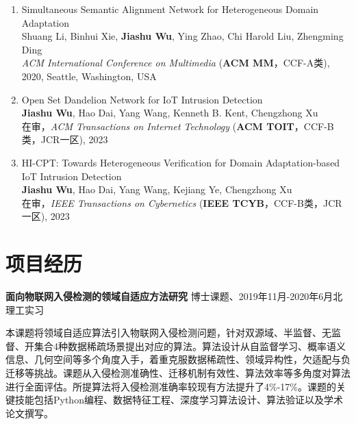 \documentclass[letterpaper,11pt]{article}
\begin{document}
\begin{enumerate}
  \item Simultaneous Semantic Alignment Network for Heterogeneous Domain Adaptation\\
  Shuang Li, Binhui Xie, \textbf{Jiashu Wu}, Ying Zhao, Chi Harold Liu\textsuperscript{\Letter}, Zhengming Ding\\
  \textit{ACM International Conference on Multimedia} (\textbf{ACM MM}，CCF-A类), 2020, Seattle, Washington, USA

  \item Open Set Dandelion Network for IoT Intrusion Detection\\
  \textbf{Jiashu Wu}, Hao Dai, Yang Wang\textsuperscript{\Letter}, Kenneth B. Kent, Chengzhong Xu\\
  在审，\textit{ACM Transactions on Internet Technology} (\textbf{ACM TOIT}，CCF-B类，JCR一区), 2023

  \item HI-CPT: Towards Heterogeneous Verification for Domain Adaptation-based IoT Intrusion Detection\\
  \textbf{Jiashu Wu}, Hao Dai, Yang Wang\textsuperscript{\Letter}, Kejiang Ye, Chengzhong Xu\\
  在审，\textit{IEEE Transactions on Cybernetics} (\textbf{IEEE TCYB}，CCF-B类，JCR一区), 2023
\end{enumerate}

\vspace{1pt}




\section{项目经历}

\textbf{面向物联网入侵检测的领域自适应方法研究} \hfill 博士课题、2019年11月-2020年6月北理工实习

\vspace{2pt}

本课题将领域自适应算法引入物联网入侵检测问题，针对双源域、半监督、无监督、开集合4种数据稀疏场景提出对应的算法。算法设计从自监督学习、概率语义信息、几何空间等多个角度入手，着重克服数据稀疏性、领域异构性，欠适配与负迁移等挑战。课题从入侵检测准确性、迁移机制有效性、算法效率等多角度对算法进行全面评估。所提算法将入侵检测准确率较现有方法提升了4\%-17\%。课题的关键技能包括Python编程、数据特征工程、深度学习算法设计、算法验证以及学术论文撰写。

\vspace{9pt}
\end{document}
